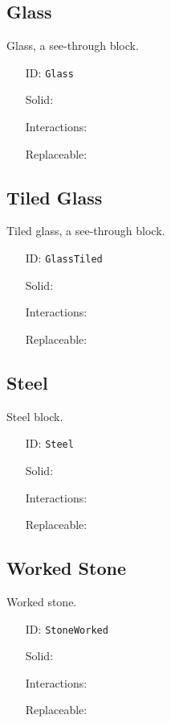 \subsection{Glass}\label{subsec:blocks_glass}
Glass, a see-through block.
\newline
\begin{itemize}[nosep]
    \item[ID:] \texttt{Glass}
    \item[Solid:]  \Checkmark \item[Interactions:]  \XSolidBrush \item[Replaceable:]  \XSolidBrush
\end{itemize}

\subsection{Tiled Glass}\label{subsec:blocks_tiled glass}
Tiled glass, a see-through block.
\newline
\begin{itemize}[nosep]
    \item[ID:] \texttt{GlassTiled}
    \item[Solid:]  \Checkmark \item[Interactions:]  \XSolidBrush \item[Replaceable:]  \XSolidBrush
\end{itemize}

\subsection{Steel}\label{subsec:blocks_steel}
Steel block.
\newline
\begin{itemize}[nosep]
    \item[ID:] \texttt{Steel}
    \item[Solid:]  \Checkmark \item[Interactions:]  \XSolidBrush \item[Replaceable:]  \XSolidBrush
\end{itemize}

\subsection{Worked Stone}\label{subsec:blocks_worked stone}
Worked stone.
\newline
\begin{itemize}[nosep]
    \item[ID:] \texttt{StoneWorked}
    \item[Solid:]  \Checkmark \item[Interactions:]  \XSolidBrush \item[Replaceable:]  \XSolidBrush
\end{itemize}

